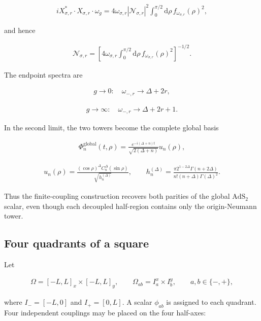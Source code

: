 \begin{align}
iX_{\sigma,r}^*\mathbin{\cdot}X_{\sigma,r}\mathbin{\cdot}\omega_g
=4\omega_{\sigma,r}|\mathcal N_{\sigma,r}|^2
\int_0^{\pi/2}\mathrm d\rho\,
f_{\omega_{\sigma,r}}(\rho)^2,
\end{align}

and hence

\begin{align}
\mathcal N_{\sigma,r}
=\left[
4\omega_{\sigma,r}
\int_0^{\pi/2}\mathrm d\rho\,
f_{\omega_{\sigma,r}}(\rho)^2
\right]^{-1/2}.
\end{align}

The endpoint spectra are

\begin{align}
g\to0:
\quad
\omega_{-,r}\to\Delta+2r,
\end{align}

\begin{align}
g\to\infty:
\quad
\omega_{-,r}\to\Delta+2r+1.
\end{align}

In the second limit, the two towers become the complete global basis

\begin{align}
\Phi_n^{\mathrm{global}}(t,\rho)
=\frac{e^{-i(\Delta+n)t}}{\sqrt{2(\Delta+n)}}u_n(\rho),
\end{align}

\begin{align}
u_n(\rho)
=\frac{(\cos\rho)^\Delta C_n^\Delta(\sin\rho)}{\sqrt{h_n^{(\Delta)}}},
\qquad
h_n^{(\Delta)}
=\frac{\pi 2^{1-2\Delta}\Gamma(n+2\Delta)}
{n!(n+\Delta)\Gamma(\Delta)^2}.
\end{align}

Thus the finite-coupling construction recovers both parities of the global $\mathrm{AdS}_2$ scalar, even though each decoupled half-region contains only the origin-Neumann tower.

\subsection{Four quadrants of a square}\label{subsec:four-quadrants}

Let

\begin{align}
\Omega=[-L,L]_x\times[-L,L]_y,
\qquad
\Omega_{ab}=I_a^x\times I_b^y,
\qquad
a,b\in\{-,+\},
\end{align}

where $I_-=[-L,0]$ and $I_+=[0,L]$. A scalar $\phi_{ab}$ is assigned to each quadrant. Four independent couplings may be placed on the four half-axes:


